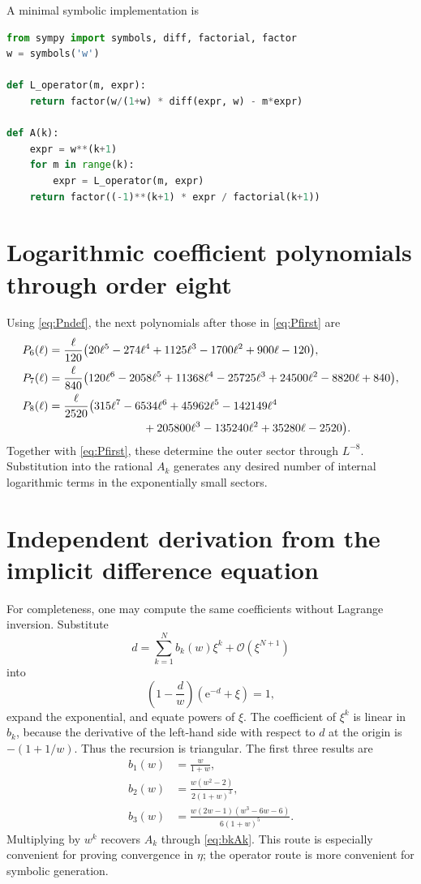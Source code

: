 \documentclass[11pt]{article}
\theoremstyle{clean}
\newcommand{\e}{\mathrm e}
\newcommand{\bigO}{\mathcal O}
\begin{document}
A minimal symbolic implementation is
\begin{lstlisting}[language=Python,caption={Generating \(A_k(w)\) symbolically.}]
from sympy import symbols, diff, factorial, factor
w = symbols('w')

def L_operator(m, expr):
    return factor(w/(1+w) * diff(expr, w) - m*expr)

def A(k):
    expr = w**(k+1)
    for m in range(k):
        expr = L_operator(m, expr)
    return factor((-1)**(k+1) * expr / factorial(k+1))
\end{lstlisting}

\section{Logarithmic coefficient polynomials through order eight}\label{app:Ppolys}

Using \cref{eq:Pndef}, the next polynomials after those in
\cref{eq:Pfirst} are
\begin{align}
P_6(\ell)={}&\frac{\ell}{120}
\bigl(20\ell^5-274\ell^4+1125\ell^3-1700\ell^2
      +900\ell-120\bigr),\label{eq:P6}\\
P_7(\ell)={}&\frac{\ell}{840}
\bigl(120\ell^6-2058\ell^5+11368\ell^4-25725\ell^3
      +24500\ell^2-8820\ell+840\bigr),\label{eq:P7}\\
P_8(\ell)={}&\frac{\ell}{2520}
\bigl(315\ell^7-6534\ell^6+45962\ell^5-142149\ell^4\notag\\
&\hspace{7em}{}+205800\ell^3-135240\ell^2+35280\ell-2520\bigr).
\label{eq:P8}
\end{align}
Together with \cref{eq:Pfirst}, these determine the outer sector through
\(L^{-8}\).  Substitution into the rational \(A_k\) generates any desired
number of internal logarithmic terms in the exponentially small sectors.

\section{Independent derivation from the implicit difference equation}

For completeness, one may compute the same coefficients without Lagrange
inversion.  Substitute
\[
  d=\sum_{k=1}^{N}b_k(w)\xi^k+\bigO(\xi^{N+1})
\]
into
\[
  \left(1-\frac{d}{w}\right)(\e^{-d}+\xi)=1,
\]
expand the exponential, and equate powers of \(\xi\).  The coefficient of
\(\xi^k\) is linear in \(b_k\), because the derivative of the left-hand side
with respect to \(d\) at the origin is \(-(1+1/w)\).  Thus the recursion is
triangular.  The first three results are
\begin{align*}
 b_1(w)&=\frac{w}{1+w},\\
 b_2(w)&=\frac{w(w^2-2)}{2(1+w)^3},\\
 b_3(w)&=\frac{w(2w-1)(w^3-6w-6)}{6(1+w)^5}.
\end{align*}
Multiplying by \(w^k\) recovers \(A_k\) through
\cref{eq:bkAk}.  This route is especially convenient for proving convergence
in \(\eta\); the operator route is more convenient for symbolic generation.
\end{document}
